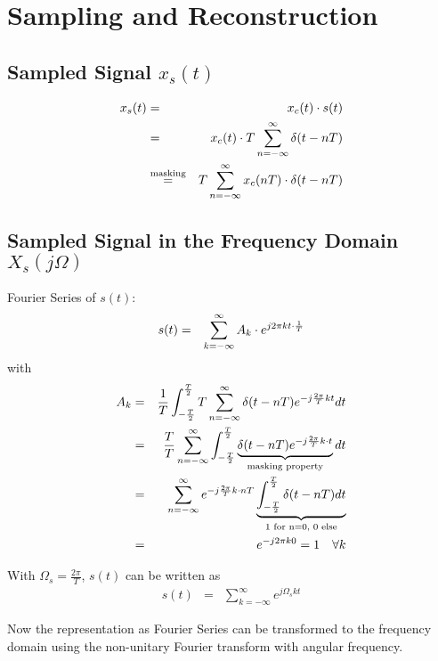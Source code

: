 \section{Sampling and Reconstruction} 

\subsection{Sampled Signal $x_s(t)$}

\begin{eqnarray*}
x_s(t) & = & x_c(t) \cdot s(t) \\
       & = & x_c(t) \cdot T \sum_{n=-\infty}^{\infty} \delta (t-nT) \\
       & \overset{\text{masking}}{=}  & T \sum_{n=-\infty}^{\infty} x_c(nT) \cdot \delta (t-nT)
\end{eqnarray*}


\subsection{Sampled Signal in the Frequency Domain $X_s(j\Omega)$}

Fourier Series of $s(t)$:
\begin{eqnarray*}
s(t) & = & \sum_{k=-\infty}^{\infty} A_k \cdot e^{j2\pi k t \cdot \frac{1}{T}}
\end{eqnarray*}
with
\begin{eqnarray*}
A_k & = & \frac{1}{T} \int_{-\frac{T}{2}}^{\frac{T}{2}} T \sum_{n=-\infty}^{\infty} \delta (t-nT) e^{-j \frac{2\pi}{T}kt}  dt \\
& = & \frac{T}{T}  \sum_{n=-\infty}^{\infty} \int_{-\frac{T}{2}}^{\frac{T}{2}} \underbrace{\delta (t-nT) e^{-j \frac{2\pi}{T}k\cdot t}}_{\text{masking property}} dt \\
& = & \sum_{n=-\infty}^{\infty}  e^{-j \frac{2\pi}{T}k\cdot nT} \underbrace{\int_{-\frac{T}{2}}^{\frac{T}{2}}  \delta (t-nT) dt}_{\text{1 for n=0, 0 else}} \\
& = & e^{-j 2 \pi k 0 } = 1 \quad \forall k
\end{eqnarray*}

With $\Omega_s = \frac{2\pi}{T}$, $s(t)$ can be written as
\begin{eqnarray*}
s(t) & = & \sum_{k=-\infty}^{\infty} e^{j \Omega_s k t}
\end{eqnarray*}

Now the representation as Fourier Series can be transformed to the frequency domain using the non-unitary Fourier transform with angular frequency.

